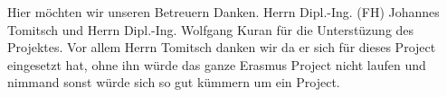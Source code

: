\begin{acknowledgements}

Hier möchten wir unseren Betreuern Danken. Herrn Dipl.-Ing. (FH) Johannes Tomitsch und Herrn Dipl.-Ing. Wolfgang Kuran für die Unterstüzung des Projektes. Vor allem Herrn Tomitsch danken wir da er sich für dieses Project eingesetzt hat, ohne ihn würde das ganze Erasmus Project nicht laufen und nimmand sonst würde sich so gut kümmern um ein Project.



\end{acknowledgements}
